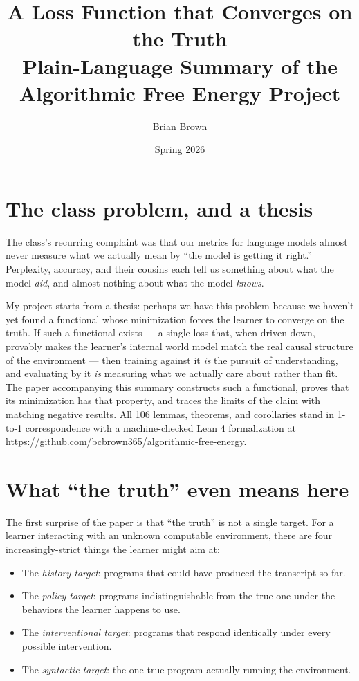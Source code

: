 \documentclass[11pt]{article}
\title{A Loss Function that Converges on the Truth\\[0.2em]
\large Plain-Language Summary of the Algorithmic Free Energy Project}
\author{Brian Brown}
\date{Spring 2026}
\begin{document}
\maketitle

\section*{The class problem, and a thesis}

The class's recurring complaint was that our metrics for language models almost never measure what we actually mean by ``the model is getting it right.'' Perplexity, accuracy, and their cousins each tell us something about what the model \emph{did}, and almost nothing about what the model \emph{knows}.

My project starts from a thesis: perhaps we have this problem because we haven't yet found a functional whose minimization forces the learner to converge on the truth. If such a functional exists --- a single loss that, when driven down, provably makes the learner's internal world model match the real causal structure of the environment --- then training against it \emph{is} the pursuit of understanding, and evaluating by it \emph{is} measuring what we actually care about rather than fit. The paper accompanying this summary constructs such a functional, proves that its minimization has that property, and traces the limits of the claim with matching negative results. All 106 lemmas, theorems, and corollaries stand in 1-to-1 correspondence with a machine-checked Lean 4 formalization at \url{https://github.com/bcbrown365/algorithmic-free-energy}.

\section*{What ``the truth'' even means here}

The first surprise of the paper is that ``the truth'' is not a single target. For a learner interacting with an unknown computable environment, there are four increasingly-strict things the learner might aim at:

\begin{itemize}
\item[(1)] The \emph{history target}: programs that could have produced the transcript so far.
\item[(2)] The \emph{policy target}: programs indistinguishable from the true one under the behaviors the learner happens to use.
\item[(3)] The \emph{interventional target}: programs that respond identically under every possible intervention.
\item[(4)] The \emph{syntactic target}: the one true program actually running the environment.
\end{itemize}
\end{document}
